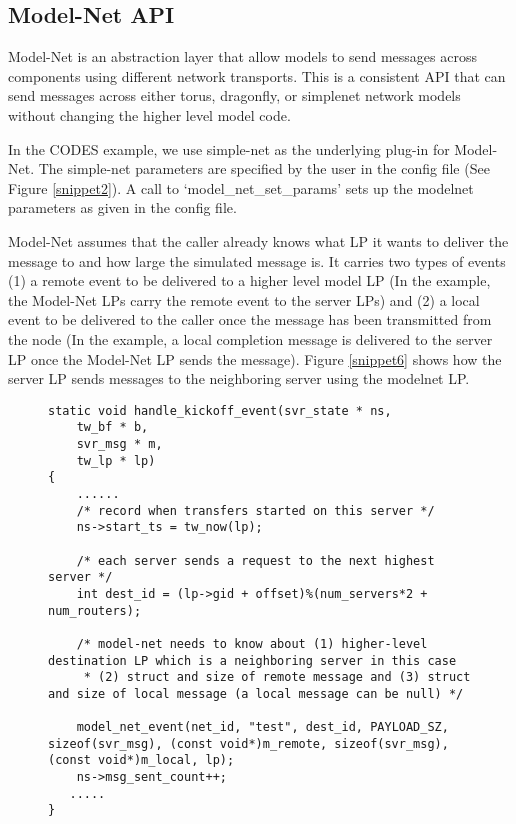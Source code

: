 \documentclass[conference,10pt,compsocconf,onecolumn]{IEEEtran}
\begin{document}
\subsection{Model-Net API}
Model-Net is an abstraction layer that allow models to send messages
across components using different network transports. This is a
consistent API that can send messages across either torus, dragonfly, or
simplenet network models without changing the higher level model code.

In the CODES example, we use simple-net as the underlying plug-in for
Model-Net. The simple-net parameters are specified by the user in the config
file (See Figure \ref{snippet2}). A call to `model\_net\_set\_params' sets up
the model\-net parameters as given in the config file.

Model-Net assumes that the caller already knows what LP it wants to deliver the
message to and how large the simulated message is. It carries two types of
events (1) a remote event to be delivered to a higher level model LP (In the
example, the Model-Net LPs carry the remote event to the server LPs) and (2) a
local event to be delivered to the caller once the message has been transmitted
from the node (In the example, a local completion message is delivered to the
server LP once the Model-Net LP sends the message). Figure \ref{snippet6} shows
how the server LP sends messages to the neighboring server using the model\-net
LP. 

\begin{figure}
\begin{lstlisting}[caption=Example code snippet showing data transfer through model-net API, label=snippet6]
static void handle_kickoff_event(svr_state * ns,
    tw_bf * b,
    svr_msg * m,
    tw_lp * lp)
{
    ......
    /* record when transfers started on this server */
    ns->start_ts = tw_now(lp);

    /* each server sends a request to the next highest server */
    int dest_id = (lp->gid + offset)%(num_servers*2 + num_routers);

    /* model-net needs to know about (1) higher-level destination LP which is a neighboring server in this case
     * (2) struct and size of remote message and (3) struct and size of local message (a local message can be null) */
    
    model_net_event(net_id, "test", dest_id, PAYLOAD_SZ, sizeof(svr_msg), (const void*)m_remote, sizeof(svr_msg), (const void*)m_local, lp);
    ns->msg_sent_count++;
   .....
}

\end{lstlisting}
\end{figure}
 
\end{document}
